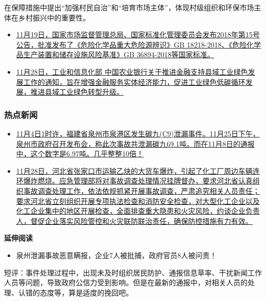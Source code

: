 \documentclass[]{book}
\providecommand{\tightlist}{%
  \setlength{\itemsep}{0pt}\setlength{\parskip}{0pt}}
\begin{document}
在保障措施中提出``加强村民自治''和``培育市场主体''，体现村级组织和环保市场主体在乡村振兴中的重要性。

\begin{itemize}
\item
  \href{http://std.sacinfo.org.cn/gnoc/queryInfo?id=5B346CFFC8BAFE6C2261363A85D93492}{11月19日，国家市场监督管理总局、国家标准化管理委员会发布2018年第15号公告，批准发布了《危险化学品重大危险源辨识》GB 18218-2018、《危险化学品生产装置和储存设施风险基准》GB 36894-2018等国家标准。}
\item
  \href{http://www.miit.gov.cn/n1146285/n1146352/n3054355/n3057542/n3057544/c6514554/content.html}{11月28日，工业和信息化部 中国农业银行关于推进金融支持县域工业绿色发展工作的通知，旨在增强金融服务实体经济能力，促进工业绿色低碳循环发展，推进县域工业绿色转型升级。}
\end{itemize}

\hypertarget{ux70edux70b9ux65b0ux95fb}{%
\subsubsection*{热点新闻}\label{ux70edux70b9ux65b0ux95fb}}

\begin{itemize}
\item
  \href{http://www.fujian.gov.cn/xw/zfgzdt/sxdt/qz/201811/t20181126_4682855.htm}{11月4日1时许，福建省泉州市泉港区发生碳九(C9)泄漏事件。11月25日下午，泉州市政府召开发布会，称此次事故共泄漏碳九69.1吨。而在11月8日的通报中，这个数字是6.97吨。几乎整整10倍！}
\item
  \href{http://www.chinasafety.gov.cn/xw/bbgz/201811/t20181130_222820.shtml}{11月28日，河北省张家口市运输乙炔的大货车爆炸，引起了化工厂周边车辆连环爆炸燃烧。应急管理部将对事故调查处理情况挂牌督办，要求河北省认真组织事故调查处理工作，依法依规抓紧开展事故调查，严肃追究相关人员责任；要求河北省立刻组织开展专项执法检查和消防安全检查，对大型化工企业以及化工企业集中的地区开展检查，全面排查重大隐患和火灾风险，约谈企业负责人，督促企业落实风险管控和火灾联防联治责任，确保防控措施有力有效。}
\end{itemize}

\textbf{延伸阅读}

\begin{itemize}
\tightlist
\item
  泉州泄漏事故恶意瞒报，企业7人被批捕，政府官员8人被问责！
\end{itemize}

短评：事件处理过程中，出现未及时组织居民防护、通报信息草率、干扰新闻工作人员等问题，导致政府公信力受到影响。但是在最新的通报中，对相关人员的处理、认错的态度等，算是适度的挽回吧。
\end{document}
